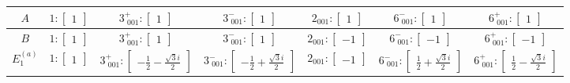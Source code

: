 \documentclass[fleqn,8pt,landscape]{jsarticle}
\begin{document}
\begin{longtable}{ccccccc}
$ A $ & $ 1:\begin{bmatrix} 1 \end{bmatrix} $ & $ 3^{+}_{\,\,001}:\begin{bmatrix} 1 \end{bmatrix} $ & $ 3^{-}_{\,\,001}:\begin{bmatrix} 1 \end{bmatrix} $ & $ 2{}_{001}:\begin{bmatrix} 1 \end{bmatrix} $ & $ 6^{-}_{\,\,001}:\begin{bmatrix} 1 \end{bmatrix} $ & $ 6^{+}_{\,\,001}:\begin{bmatrix} 1 \end{bmatrix} $ \\ \hline
$ B $ & $ 1:\begin{bmatrix} 1 \end{bmatrix} $ & $ 3^{+}_{\,\,001}:\begin{bmatrix} 1 \end{bmatrix} $ & $ 3^{-}_{\,\,001}:\begin{bmatrix} 1 \end{bmatrix} $ & $ 2{}_{001}:\begin{bmatrix} -1 \end{bmatrix} $ & $ 6^{-}_{\,\,001}:\begin{bmatrix} -1 \end{bmatrix} $ & $ 6^{+}_{\,\,001}:\begin{bmatrix} -1 \end{bmatrix} $ \\ \hline
$ E_{1}^{(a)} $ & $ 1:\begin{bmatrix} 1 \end{bmatrix} $ & $ 3^{+}_{\,\,001}:\begin{bmatrix} - \frac{1}{2} - \frac{\sqrt{3} i}{2} \end{bmatrix} $ & $ 3^{-}_{\,\,001}:\begin{bmatrix} - \frac{1}{2} + \frac{\sqrt{3} i}{2} \end{bmatrix} $ & $ 2{}_{001}:\begin{bmatrix} -1 \end{bmatrix} $ & $ 6^{-}_{\,\,001}:\begin{bmatrix} \frac{1}{2} + \frac{\sqrt{3} i}{2} \end{bmatrix} $ & $ 6^{+}_{\,\,001}:\begin{bmatrix} \frac{1}{2} - \frac{\sqrt{3} i}{2} \end{bmatrix} $ \\ \hline

\end{longtable}
\end{document}
